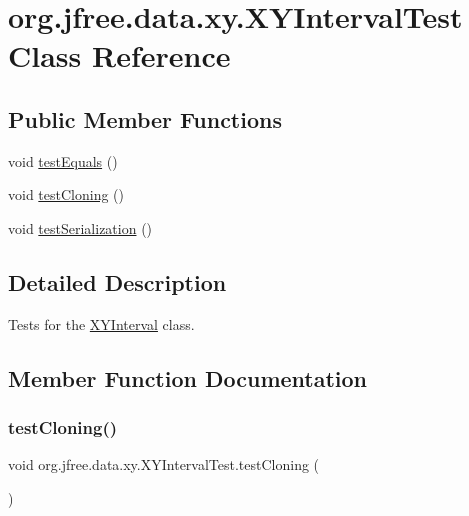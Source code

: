 \hypertarget{classorg_1_1jfree_1_1data_1_1xy_1_1_x_y_interval_test}{}\section{org.\+jfree.\+data.\+xy.\+X\+Y\+Interval\+Test Class Reference}
\label{classorg_1_1jfree_1_1data_1_1xy_1_1_x_y_interval_test}
\subsection*{Public Member Functions}
\begin{DoxyCompactItemize}
\item 
void \mbox{\hyperlink{classorg_1_1jfree_1_1data_1_1xy_1_1_x_y_interval_test_a5b4167a9be85014fcebe8e5264ee4c6b}{test\+Equals}} ()
\item 
void \mbox{\hyperlink{classorg_1_1jfree_1_1data_1_1xy_1_1_x_y_interval_test_aaa6f3941fa3c487d608f60c7ea74e1bb}{test\+Cloning}} ()
\item 
void \mbox{\hyperlink{classorg_1_1jfree_1_1data_1_1xy_1_1_x_y_interval_test_abff95d6aae698d1bc45ef0bebcdacd0a}{test\+Serialization}} ()
\end{DoxyCompactItemize}


\subsection{Detailed Description}
Tests for the \mbox{\hyperlink{classorg_1_1jfree_1_1data_1_1xy_1_1_x_y_interval}{X\+Y\+Interval}} class. 

\subsection{Member Function Documentation}
\mbox{\label{classorg_1_1jfree_1_1data_1_1xy_1_1_x_y_interval_test_aaa6f3941fa3c487d608f60c7ea74e1bb}} 
\subsubsection{\texorpdfstring{test\+Cloning()}{testCloning()}}
{\footnotesize\ttfamily void org.\+jfree.\+data.\+xy.\+X\+Y\+Interval\+Test.\+test\+Cloning (\begin{DoxyParamCaption}{ }\end{DoxyParamCaption})}

